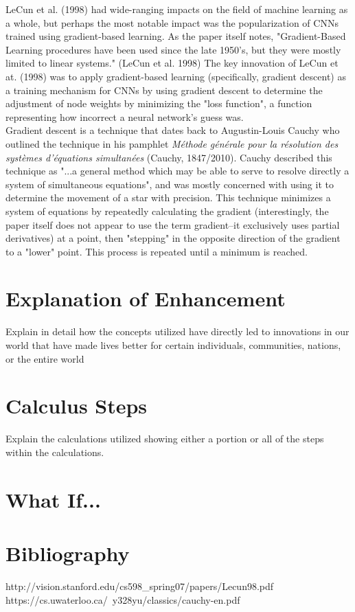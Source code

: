 \documentclass[11pt, a4paper]{article}
\begin{document}
LeCun et al. (1998) had wide-ranging impacts on the field of machine learning as a whole, but perhaps the most 
notable impact was the popularization of CNNs trained using gradient-based learning. As the paper itself notes, 
"Gradient-Based Learning procedures have been used since the late 1950's, but they were mostly limited to 
linear systems." (LeCun et al. 1998)  The key innovation of LeCun et at. (1998) was to apply gradient-based 
learning (specifically, gradient descent) as a training mechanism for CNNs by using gradient descent to determine
the adjustment of node weights by minimizing the "loss function", a function representing how incorrect a neural 
network's guess was.\\

Gradient descent is a technique that dates back to Augustin-Louis Cauchy who outlined the technique in his pamphlet 
\textit{M\'ethode g\'en\'erale pour la r\'esolution des syst\`emes d'\'equations simultan\'ees} (Cauchy, 1847/2010). Cauchy described this technique as "...a general 
method which may be able to serve to resolve directly a system of simultaneous equations", and was mostly concerned
with using it to determine the movement of a star with precision. This technique minimizes a system of equations by repeatedly
calculating the gradient (interestingly, the paper itself does not appear to use the term gradient--it exclusively
uses partial derivatives) at a point, then "stepping" in the opposite direction of the gradient to a "lower" point. This 
process is repeated until a minimum is reached. 



\section{Explanation of Enhancement}
Explain in detail how the concepts utilized have directly led to innovations in our world that have made lives better for certain individuals, communities, nations, or the entire world

\section{Calculus Steps}
Explain the calculations utilized showing either a portion or all of the steps within the calculations.

\section{What If...}


\section{Bibliography}
http://vision.stanford.edu/cs598_spring07/papers/Lecun98.pdf
https://cs.uwaterloo.ca/~y328yu/classics/cauchy-en.pdf
\end{document}

